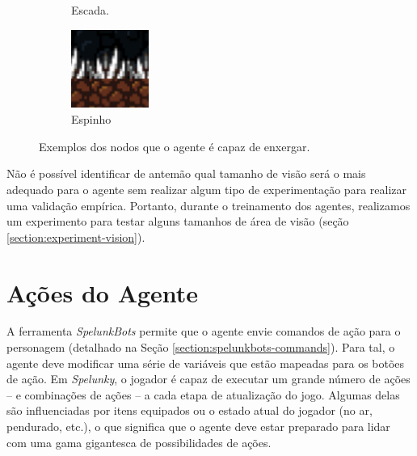\begin{figure}[H]
\begin{subfigure}[b]{0.15\textwidth}
		\caption{Escada.}
	\end{subfigure}
	\begin{subfigure}[b]{0.15\textwidth}
        \includegraphics[width=\textwidth]{fig/spelunky-spike.pdf}
		\caption{Espinho}
	\end{subfigure}
	\caption{Exemplos dos nodos que o agente é capaz de enxergar.}
	\label{fig:vision-nodes}
\end{figure}

Não é possível identificar de antemão qual tamanho de visão será o mais adequado
para o agente sem realizar algum tipo de experimentação para realizar uma
validação empírica. Portanto, durante o treinamento dos agentes, realizamos um
experimento para testar alguns tamanhos de área de visão (seção
\ref{section:experiment-vision}).


\section{\label{section:modelling-outputs}Ações do Agente}
A ferramenta \textit{SpelunkBots} permite que o agente envie comandos de ação
para o personagem (detalhado na Seção \ref{section:spelunkbots-commands}). Para
tal, o agente deve modificar uma série de variáveis que estão mapeadas para os
botões de ação. Em \textit{Spelunky}, o jogador é capaz de executar um grande
número de ações -- e combinações de ações -- a cada etapa de atualização do
jogo. Algumas delas são influenciadas por itens equipados ou o estado atual do
jogador (no ar, pendurado, etc.), o que significa que o agente deve estar
preparado para lidar com uma gama gigantesca de possibilidades de ações.

